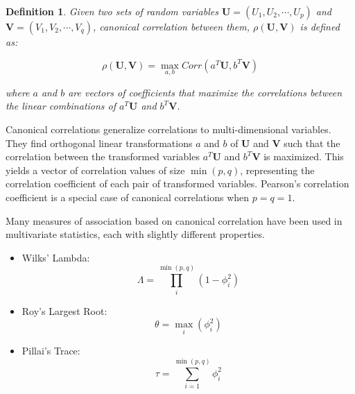 \documentclass{uai2025} %
\newtheorem{definition}{Definition}
\begin{document}
\begin{definition} 

	Given two sets of random variables $ \bm{U} = (U_1, U_2, \cdots, U_p) $
	and $ \bm{V} = (V_1, V_2, \cdots, V_q) $, canonical correlation between
	them, $\rho(\bm{U}, \bm{V}) $ is defined as:
		

	\begin{equation}
		\rho(\bm{U}, \bm{V}) = \max_{a, b} Corr(a^T \bm{U}, b^T \bm{V})
	\end{equation}

	where $ a $ and $ b $ are vectors of coefficients that maximize the correlations
	between the linear combinations of $ a^T \bm{U} $ and $ b^T \bm{V} $.
\end{definition}

	
Canonical correlations generalize correlations to multi-dimensional variables. They
find orthogonal linear transformations $ a $ and $ b $ of $ \bm{U} $ and $ \bm{V} $
such that the correlation between the transformed variables $ a^T \bm{U} $ and 
$ b^T \bm{V} $ is maximized. This yields a vector of correlation values of 
size $ \min(p, q) $, representing the correlation coefficient of each pair of 
transformed variables. Pearson's correlation coefficient is a special case of 
canonical correlations when $ p = q = 1 $.

Many measures of association based on canonical correlation have been used in
multivariate statistics, each with slightly different properties.
\begin{itemize}
	\item Wilks' Lambda:
		$$ \Lambda = \prod_{i}^{\min(p, q)} (1 - \phi_i^2) $$
	\item Roy's Largest Root: 
		$$ \theta = \max_i(\phi_i^2) $$
	\item Pillai's Trace: 
		$$ \tau = \sum_{i=1}^{\min(p, q)} \phi_i^2 $$
\end{itemize}
\end{document}
